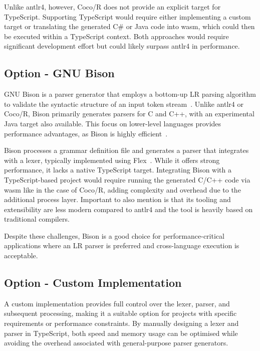 Unlike \Gls{antlr4}, however, Coco/R does not provide an explicit target for TypeScript. Supporting TypeScript would require either implementing a custom target or translating the generated C\# or Java code into \acrshort{wasm}, which could then be executed within a TypeScript context. Both approaches would require significant development effort but could likely surpass \Gls{antlr4} in performance.

\subsection{Option - GNU Bison}
\label{sec:parser-technology-option-bison}

GNU Bison is a parser generator that employs a bottom-up LR parsing algorithm to validate the syntactic structure of an input token stream~\cite{bison}. Unlike \Gls{antlr4} or Coco/R, Bison primarily generates parsers for C and C++, with an experimental Java target also available. This focus on lower-level languages provides performance advantages, as Bison is highly efficient~\cite{bison-manual}.

Bison processes a grammar definition file and generates a parser that integrates with a lexer, typically implemented using Flex~\cite{flex}. While it offers strong performance, it lacks a native TypeScript target. Integrating Bison with a TypeScript-based project would require running the generated C/C++ code via \acrshort{wasm} like in the case of Coco/R, adding complexity and overhead due to the additional process layer. Important to also mention is that its tooling and extensibility are less modern compared to \Gls{antlr4} and the tool is heavily based on traditional compilers.

Despite these challenges, Bison is a good choice for performance-critical applications where an LR parser is preferred and cross-language execution is acceptable.

\subsection{Option - Custom Implementation}
\label{sec:parser-technology-option-custom}

A custom implementation provides full control over the lexer, parser, and subsequent processing, making it a suitable option for projects with specific requirements or performance constraints. By manually designing a lexer and parser in TypeScript, both speed and memory usage can be optimised while avoiding the overhead associated with general-purpose parser generators.


